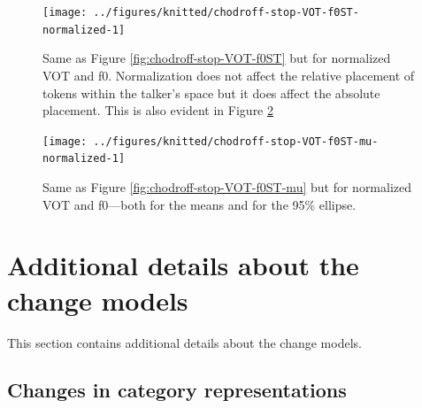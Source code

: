 \documentclass[
  11pt,
  english,
  man,floatsintext]{apa6}
\begin{document}
\begin{figure}

{\centering \texttt{[image: ../figures/knitted/chodroff-stop-VOT-f0ST-normalized-1]} 

}

\caption{Same as Figure \ref{fig:chodroff-stop-VOT-f0ST} but for normalized VOT and f0. Normalization does not affect the relative placement of tokens within the talker's space but it does affect the absolute placement. This is also evident in Figure \ref{fig:chodroff-stop-VOT-f0ST-mu-normalized}}\label{fig:chodroff-stop-VOT-f0ST-normalized}
\end{figure}



\begin{figure}

{\centering \texttt{[image: ../figures/knitted/chodroff-stop-VOT-f0ST-mu-normalized-1]} 

}

\caption{Same as Figure \ref{fig:chodroff-stop-VOT-f0ST-mu} but for normalized VOT and f0---both for the means and for the 95\% ellipse.}\label{fig:chodroff-stop-VOT-f0ST-mu-normalized}
\end{figure}

\hypertarget{sec:SI-models}{%
\section{Additional details about the change models}\label{sec:SI-models}}

This section contains additional details about the change models.

\hypertarget{sec:SI-models-changes-in-representations}{%
\subsection{Changes in category representations}\label{sec:SI-models-changes-in-representations}}
\end{document}
